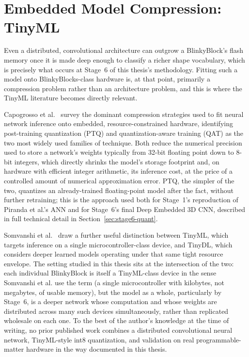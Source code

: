 \documentclass[12pt,a4paper]{report}
\begin{document}
\section{Embedded Model Compression: TinyML}

Even a distributed, convolutional architecture can outgrow a BlinkyBlock's flash memory once it is made deep enough to classify a richer shape vocabulary, which is precisely what occurs at Stage~6 of this thesis's methodology. Fitting such a model onto BlinkyBlocks-class hardware is, at that point, primarily a compression problem rather than an architecture problem, and this is where the TinyML literature becomes directly relevant.

Capogrosso et al.~\cite{capogrosso} survey the dominant compression strategies used to fit neural network inference onto embedded, resource-constrained hardware, identifying post-training quantization (PTQ) and quantization-aware training (QAT) as the two most widely used families of technique. Both reduce the numerical precision used to store a network's weights typically from 32-bit floating point down to 8-bit integers, which directly shrinks the model's storage footprint and, on hardware with efficient integer arithmetic, its inference cost, at the price of a controlled amount of numerical approximation error. PTQ, the simpler of the two, quantizes an already-trained floating-point model after the fact, without further retraining; this is the approach used both for Stage~1's reproduction of Piranda et al.'s ANN and for Stage~6's final Deep Embedded 3D CNN, described in full technical detail in Section~\ref{sec:stage6-quant}.

Somvanshi et al.~\cite{somvanshi} draw a further useful distinction between TinyML, which targets inference on a single microcontroller-class device, and TinyDL, which considers deeper learned models operating under that same tight resource envelope. The setting studied in this thesis sits at the intersection of the two: each individual BlinkyBlock is itself a TinyML-class device in the sense Somvanshi et al. use the term (a single microcontroller with kilobytes, not megabytes, of usable memory), but the model as a whole, particularly by Stage~6, is a deeper network whose computation and whose weights are distributed across many such devices simultaneously, rather than replicated wholesale on each one. To the best of the author's knowledge at the time of writing, no prior published work combines a distributed convolutional neural network, TinyML-style int8 quantization, and validation on real programmable-matter hardware in the way documented in this thesis.
\end{document}
